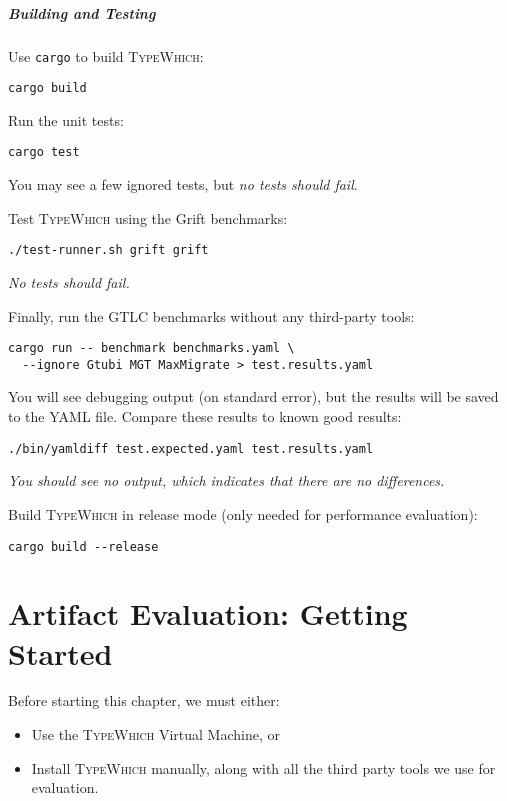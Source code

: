 \documentclass{book}
\newcommand{\system}{\textsc{TypeWhich}\xspace}
\begin{document}
\paragraph{Building and Testing}

Use \texttt{cargo} to build \system:

\begin{verbatim}
cargo build
\end{verbatim}

Run the unit tests:
\begin{verbatim}
cargo test
\end{verbatim}
You may see a few ignored tests, but \emph{no tests should fail}.

Test \system using the Grift benchmarks:
\begin{verbatim}
./test-runner.sh grift grift
\end{verbatim}
\emph{No tests should fail.}

Finally, run the GTLC benchmarks without any third-party tools:
\begin{verbatim}
cargo run -- benchmark benchmarks.yaml \
  --ignore Gtubi MGT MaxMigrate > test.results.yaml
\end{verbatim}
You will see debugging output (on standard error), but the results will
be saved to the YAML file. Compare these results to known good results:
\begin{verbatim}
./bin/yamldiff test.expected.yaml test.results.yaml
\end{verbatim}
\emph{You should see no output, which indicates that there are no
differences.}

Build \system in release mode (only needed for performance evaluation):

\begin{verbatim}
cargo build --release
\end{verbatim}

\chapter{Artifact Evaluation: Getting Started}
\label{getting-started} 

Before starting this chapter, we must either:

\begin{itemize}

     \item Use the \system Virtual Machine, or

     \item Install \system manually, along with all the third party
     tools we use for evaluation.

\end{itemize}
\end{document}
